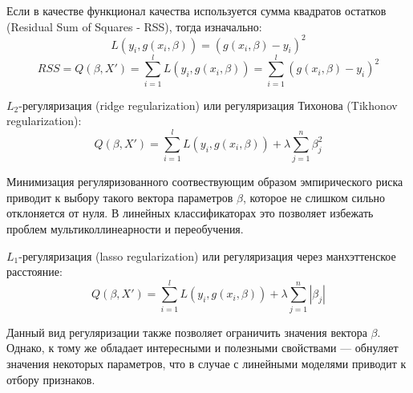 Если в качестве функционал качества используется сумма квадратов остатков (Residual Sum of Squares - RSS), тогда изначально:
\begin{equation}
L(y_i, g(x_i, \beta)) = (g(x_i, \beta) - y_i)^2
\end{equation}
\begin{equation}
RSS = Q(\beta, X') = \sum_{i=1}^{l} L(y_i, g(x_i, \beta)) = \sum_{i=1}^{l} (g(x_i, \beta) - y_i)^2
\end{equation}

$ L_2 $-регуляризация (ridge regularization) или регуляризация Тихонова (Tikhonov regularization):
\begin{equation}
Q(\beta, X') = \sum_{i=1}^{l} L(y_i, g(x_i, \beta)) + \lambda \sum_{j=1}^{n} \beta_j^2
\end{equation}

Минимизация регуляризованного соотвествующим образом эмпирического риска приводит к выбору такого вектора параметров $ \beta $, которое не слишком сильно отклоняется от нуля. В линейных классификаторах это позволяет избежать проблем мультиколлинеарности и переобучения. 

$ L_1 $-регуляризация (lasso regularization) или регуляризация через манхэттенское расстояние:
\begin{equation}
	Q(\beta, X') = \sum_{i=1}^{l} L(y_i, g(x_i, \beta)) + \lambda \sum_{j=1}^{n} |\beta_j|
\end{equation}

Данный вид регуляризации также позволяет ограничить значения вектора $ \beta $. Однако, к тому же обладает интересными и полезными свойствами — обнуляет значения некоторых параметров, что в случае с линейными моделями приводит к отбору признаков.


\clearpage
